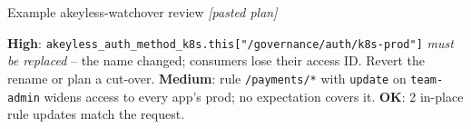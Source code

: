 \begin{session}{Example}
\you akeyless-watchover review \emph{[pasted plan]}

\agent \textbf{High}: \texttt{akeyless\_auth\_method\_k8s.this["/governance/auth/k8s-prod"]} \emph{must be
replaced} -- the name changed; consumers lose their access ID. Revert the rename or plan a cut-over.
\textbf{Medium}: rule \texttt{/payments/*} with \texttt{update} on \texttt{team-admin} widens access
to every app's prod; no expectation covers it. \textbf{OK}: 2 in-place rule updates match the request.
\end{session}
